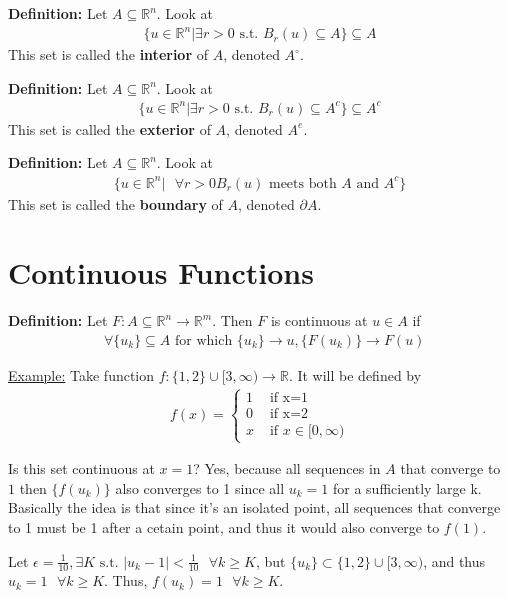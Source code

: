 \documentclass{article}
\newcommand*{\txt}[1]{\text{ #1 }}%
\newcommand*{\fora}{\txt{}\forall}%
\newcommand*{\rr}{\mathbb{R}}%
\begin{document}
\textbf{Definition:} Let $A\subseteq \rr^n$. Look at \begin{align*}
    \{u\in \rr^n|\exists r>0\txt{s.t.} B_r(u)\subseteq A\}\subseteq A
\end{align*} 
This set is called the \textbf{interior} of $A$, denoted $A^\circ$.

\textbf{Definition:} Let $A\subseteq \rr^n$. Look at \begin{align*}
    \{u\in \rr^n|\exists r>0\txt{s.t.} B_r(u)\subseteq A^c\}\subseteq A^c
\end{align*}
This set is called the \textbf{exterior} of $A$, denoted $A^e$.

\textbf{Definition:} Let $A\subseteq \rr^n$. Look at \begin{align*}
    \{u\in \rr^n|\fora r>0 B_r(u)\txt{meets both}A\txt{and}A^c\}
\end{align*}
This set is called the \textbf{boundary} of $A$, denoted $\partial A$.

\section{Continuous Functions}

\textbf{Definition:} Let $F:A\subseteq \rr^n\to \rr^m$. Then $F$ is continuous at $u\in A$ if \begin{align*}
    \fora \{u_k\}\subseteq A \txt{for which} \{u_k\}\to u, \{F(u_k)\}\to F(u)
\end{align*}

\underline{Example:} Take function $f:\{1,2\}\cup [3,\infty)\to \rr$. It will be defined by \begin{align*}
    f(x)=\begin{cases}
        1 & \txt{if x=1} \\
        0 & \txt{if x=2} \\
        x & \txt{if}x\in[0,\infty)
    \end{cases}
\end{align*}

Is this set continuous at $x=1$? Yes, because all sequences in $A$ that converge to $1$ then $\{f(u_k)\}$ also converges to 1 since all $u_k=1$ for a sufficiently large k. Basically the idea is that since it's an isolated point, all sequences that converge to 1 must be 1 after a cetain point, and thus it would also converge to $f(1)$.

Let $\epsilon=\frac{1}{10}, \exists K \txt{s.t.} |u_k-1|<\frac{1}{10}\fora k\geq K$, but $\{u_k\}\subset\{1,2\}\cup[3,\infty)$, and thus $u_k=1\fora k\geq K$. Thus, $f(u_k)=1\fora k\geq K$.
\end{document}
